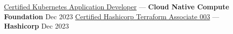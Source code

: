 \href{https://www.credly.com/badges/f496c372-5779-49d9-b51a-58aff3c5963b/public_url}{Certified Kubernetes Application Developer} --- \textbf{Cloud Native Compute Foundation} \hfill Dec 2023
\href{https://www.credly.com/badges/d0127be5-b859-4703-9c42-62f73ad796ed/public_url}{Certified Hashicorp Terraform Associate 003} --- \textbf{Hashicorp} \hfill Dec 2023